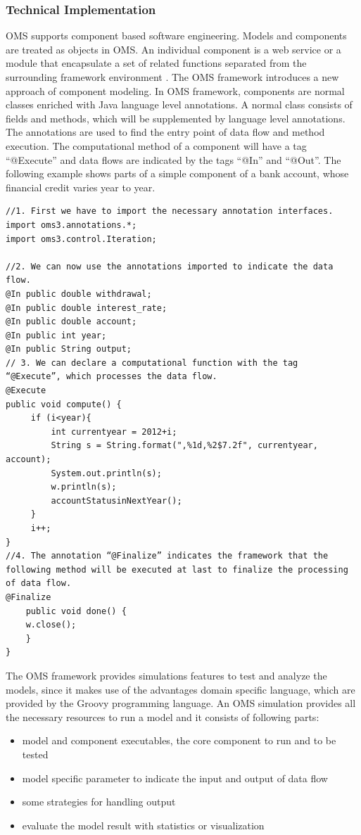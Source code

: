 \subsubsection{Technical Implementation}
\par
OMS supports component based software engineering. Models and components are treated as objects in OMS. An individual component is a web service or a module that encapsulate a set of related functions separated from the surrounding framework environment \autocite{dsl:oms-component_based}. The OMS framework introduces a new approach of component modeling. In OMS framework, components are normal classes enriched with Java language level annotations. A normal class consists of fields and methods, which will be supplemented by language level annotations. The annotations are used to find the entry point of data flow and method execution. The computational method of a component will have a tag “@Execute” and data flows are indicated by the tags “@In” and “@Out”.
The following example shows parts of a simple component of a bank account, whose financial credit varies year to year.
\begin{verbatim}
//1. First we have to import the necessary annotation interfaces.
import oms3.annotations.*;
import oms3.control.Iteration;

//2. We can now use the annotations imported to indicate the data flow.
@In public double withdrawal;
@In public double interest_rate;
@In public double account;
@In public int year;
@In public String output;
// 3. We can declare a computational function with the tag 
“@Execute”, which processes the data flow.
@Execute
public void compute() {
	 if (i<year){
		 int currentyear = 2012+i;
		 String s = String.format(",%1d,%2$7.2f", currentyear, account);
		 System.out.println(s);
		 w.println(s);
		 accountStatusinNextYear();
	 }
	 i++;
}
//4. The annotation “@Finalize” indicates the framework that the 
following method will be executed at last to finalize the processing 
of data flow.
@Finalize
	public void done() {
	w.close();
	}
}
\end{verbatim}
\par
The OMS framework provides simulations features to test and analyze the models, since it makes use of the advantages domain specific language, which are provided by the Groovy programming language. An OMS simulation provides all the necessary resources to run a model and it consists of following parts:
\begin{itemize}
  \item model and component executables, the core component to run and to be tested	
  \item model specific parameter to indicate the input and output of data flow
  \item some strategies for handling output	
  \item evaluate the model result with statistics or visualization
\end{itemize}
